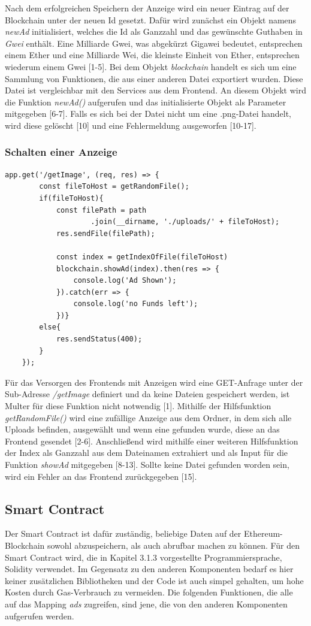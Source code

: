 Nach dem erfolgreichen Speichern der Anzeige wird ein neuer Eintrag auf der Blockchain unter der neuen Id gesetzt. 
Dafür wird zunächst ein Objekt namens \emph{newAd} initialisiert, welches die Id als Ganzzahl und das gewünschte Guthaben in \emph{Gwei} enthält. 
Eine Milliarde Gwei, was abgekürzt Gigawei bedeutet, entsprechen einem Ether und eine Milliarde Wei, die kleinste Einheit von Ether, entsprechen wiederum einem Gwei [1-5]. 
Bei dem Objekt \emph{blockchain} handelt es sich um eine Sammlung von Funktionen, die aus einer anderen Datei exportiert wurden. Diese Datei ist vergleichbar mit den Services aus dem Frontend. An diesem Objekt wird die Funktion \emph{newAd()} aufgerufen und das initialisierte Objekt als Parameter mitgegeben [6-7].
Falls es sich bei der Datei nicht um eine .png-Datei handelt, wird diese gelöscht [10] und eine Fehlermeldung ausgeworfen [10-17].
\subsubsection{Schalten einer Anzeige}
\begin{lstlisting}[caption={Schalten einer Anzeige im Backend},captionpos=b]
	app.get('/getImage', (req, res) => {
		const fileToHost = getRandomFile();
		if(fileToHost){
			const filePath = path
					.join(__dirname, './uploads/' + fileToHost);
			res.sendFile(filePath);
			
			const index = getIndexOfFile(fileToHost)
			blockchain.showAd(index).then(res => {
				console.log('Ad Shown');
			}).catch(err => {
				console.log('no Funds left');
			})}
		else{
			res.sendStatus(400);
		}
	});
\end{lstlisting}
Für das Versorgen des Frontends mit Anzeigen wird eine GET-Anfrage unter der Sub-Adresse \emph{/getImage} definiert und da keine Dateien gespeichert werden, ist Multer für diese Funktion nicht notwendig [1]. Mithilfe der Hilfsfunktion \emph{getRandomFile()} wird eine zufällige Anzeige aus dem Ordner, in dem sich alle Uploads befinden, ausgewählt und wenn eine gefunden wurde, diese an das Frontend gesendet [2-6]. Anschließend wird mithilfe einer weiteren Hilfsfunktion der Index als Ganzzahl aus dem Dateinamen extrahiert und als Input für die Funktion \emph{showAd} mitgegeben [8-13]. Sollte keine Datei gefunden worden sein, wird ein Fehler an das Frontend zurückgegeben [15].
\subsection{Smart Contract}
Der Smart Contract ist dafür zuständig, beliebige Daten auf der Ethereum-Blockchain sowohl abzuspeichern, als auch abrufbar machen zu können.
Für den Smart Contract wird, die in Kapitel 3.1.3 vorgestellte Programmiersprache, Solidity verwendet. Im Gegensatz zu den anderen Komponenten bedarf es hier keiner zusätzlichen Bibliotheken und der Code ist auch simpel gehalten, um hohe Kosten durch Gas-Verbrauch zu vermeiden. Die folgenden Funktionen, die alle auf das Mapping \emph{ads} zugreifen, sind jene, die von den anderen Komponenten aufgerufen werden.
